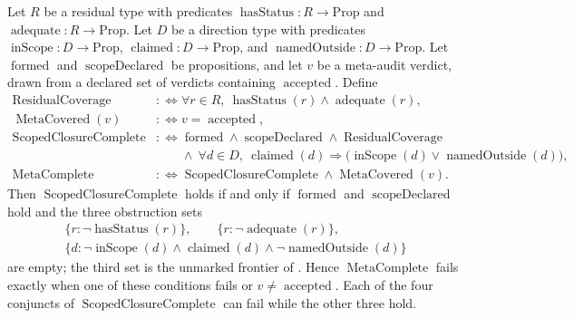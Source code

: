 \begin{theorem}\label{thm:F52}
Let \(R\) be a residual type with predicates
\(\operatorname{hasStatus}:R\to\mathrm{Prop}\) and
\(\operatorname{adequate}:R\to\mathrm{Prop}\). Let \(D\) be a direction
type with predicates \(\operatorname{inScope}:D\to\mathrm{Prop}\),
\(\operatorname{claimed}:D\to\mathrm{Prop}\), and
\(\operatorname{namedOutside}:D\to\mathrm{Prop}\). Let
\(\operatorname{formed}\) and \(\operatorname{scopeDeclared}\) be
propositions, and let
\(v\) be a meta-audit verdict, drawn from a declared set of verdicts
containing \(\operatorname{accepted}\). Define
\begin{align*}
  \operatorname{ResidualCoverage}
  &:\Longleftrightarrow
  \forall r\in R,\ \operatorname{hasStatus}(r)\wedge\operatorname{adequate}(r),\\
  \operatorname{MetaCovered}(v)
  &:\Longleftrightarrow v=\operatorname{accepted},\\
  \operatorname{ScopedClosureComplete}
  &:\Longleftrightarrow
  \operatorname{formed}\wedge\operatorname{scopeDeclared}\wedge
  \operatorname{ResidualCoverage}\\
  &\qquad\wedge\
  \forall d\in D,\ \operatorname{claimed}(d)\Rightarrow
    \bigl(\operatorname{inScope}(d)\vee\operatorname{namedOutside}(d)\bigr),\\
  \operatorname{MetaComplete}
  &:\Longleftrightarrow \operatorname{ScopedClosureComplete}\wedge\operatorname{MetaCovered}(v).
\end{align*}
Then \(\operatorname{ScopedClosureComplete}\) holds if and only if
\(\operatorname{formed}\) and \(\operatorname{scopeDeclared}\) hold and the
three obstruction sets
\[
\begin{gathered}
  \{r:\neg\operatorname{hasStatus}(r)\},\qquad
  \{r:\neg\operatorname{adequate}(r)\},\\
  \{d:\neg\operatorname{inScope}(d)\wedge\operatorname{claimed}(d)
      \wedge\neg\operatorname{namedOutside}(d)\}
\end{gathered}
\]
are empty; the third set is the unmarked frontier of
. Hence \(\operatorname{MetaComplete}\) fails
exactly when one of these conditions fails or \(v\ne\operatorname{accepted}\).
Each of the four conjuncts of \(\operatorname{ScopedClosureComplete}\) can fail
while the other three hold.
\end{theorem}
